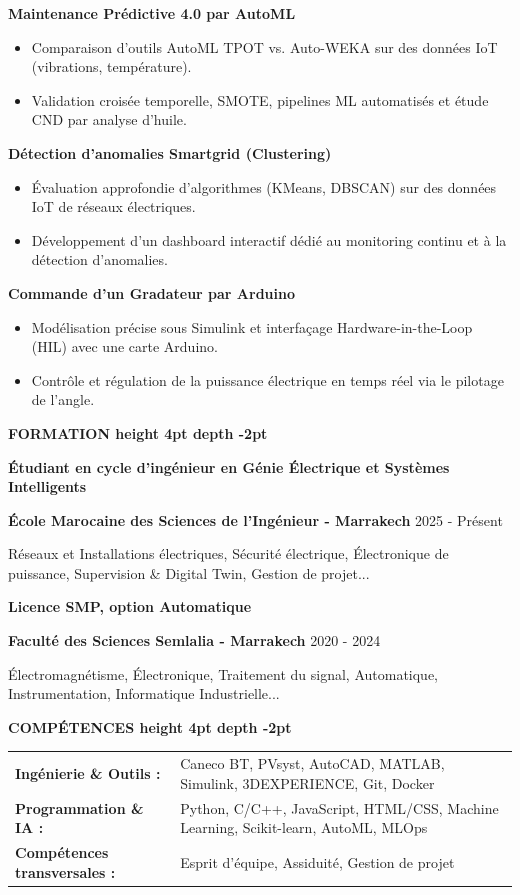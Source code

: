 \documentclass[10pt,a4paper]{altacv}
\renewcommand{\cvsection}[2][]{%
  \medskip%
  {\color{heading}\LARGE\bfseries #2 \hspace{0.2em}\leaders\vrule height 4pt depth -2pt\hfill\mbox{}}\par\smallskip
}
\renewcommand{\cvevent}[4]{%
  {\large\bfseries\color{accent}#1\par}
  \smallskip\normalsize
  \ifstrequal{#2}{}{}{%
    \textbf{\color{emphasis}#2\ifstrequal{#4}{}{}{ - #4}}%
  }%
  \hfill
  \ifstrequal{#3}{}{}{{\small#3}}%
  \par\smallskip
}
\begin{document}
{\large\bfseries\color{accent} Maintenance Prédictive 4.0 par AutoML}\\[0.05cm]
\begin{itemize}
  \item Comparaison d'outils AutoML TPOT vs. Auto-WEKA sur des données IoT (vibrations, température).
  \item Validation croisée temporelle, SMOTE, pipelines ML automatisés et étude CND par analyse d'huile.
\end{itemize}

{\large\bfseries\color{accent} Détection d'anomalies Smartgrid (Clustering)}\\[0.05cm]
\begin{itemize}
  \item Évaluation approfondie d'algorithmes (KMeans, DBSCAN) sur des données IoT de réseaux électriques.
  \item Développement d'un dashboard interactif dédié au monitoring continu et à la détection d'anomalies.
\end{itemize}

{\large\bfseries\color{accent} Commande d'un Gradateur par Arduino}\\[0.05cm]
\begin{itemize}
  \item Modélisation précise sous Simulink et interfaçage Hardware-in-the-Loop (HIL) avec une carte Arduino.
  \item Contrôle et régulation de la puissance électrique en temps réel via le pilotage de l'angle.
\end{itemize}


\cvsection{FORMATION}
\cvevent{Étudiant en cycle d'ingénieur en Génie Électrique et Systèmes Intelligents}{École Marocaine des Sciences de l'Ingénieur}{2025 - Présent}{Marrakech}
\small Réseaux et Installations électriques, Sécurité électrique, Électronique de puissance, Supervision \& Digital Twin, Gestion de projet...

\cvevent{Licence SMP, option Automatique}{Faculté des Sciences Semlalia}{2020 - 2024}{Marrakech}
\small Électromagnétisme, Électronique, Traitement du signal, Automatique, Instrumentation, Informatique Industrielle...

\cvsection{COMPÉTENCES}
\begin{tabular}{@{}ll@{}}
\textbf{Ingénierie \& Outils :} & Caneco BT, PVsyst, AutoCAD, MATLAB, Simulink, 3DEXPERIENCE, Git, Docker \\[2pt]
\textbf{Programmation \& IA :} & Python, C/C++, JavaScript, HTML/CSS, Machine Learning, Scikit-learn, AutoML, MLOps \\[2pt]
\textbf{Compétences transversales :} & Esprit d'équipe, Assiduité, Gestion de projet \\
\end{tabular}
\end{document}
